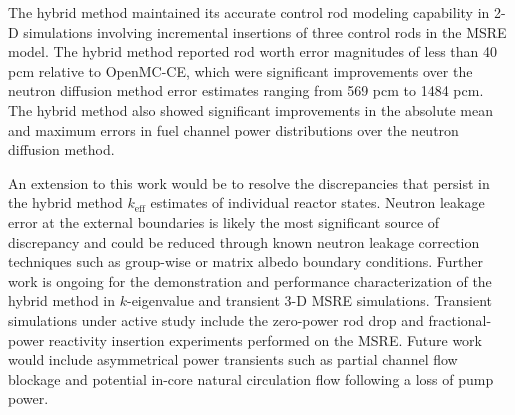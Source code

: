 The hybrid method maintained its accurate control rod modeling capability in 2-D simulations
involving incremental insertions of three control rods in the \gls{MSRE} model.
The hybrid method reported rod worth error magnitudes of less than 40 pcm relative to OpenMC-CE,
which were significant improvements over the neutron diffusion method error estimates ranging from
569 pcm to 1484 pcm. The hybrid method also showed significant improvements in the absolute mean
and maximum errors in fuel channel power distributions over the neutron diffusion method.

An extension to this work would be to resolve the discrepancies that persist in the hybrid method
$k_\text{eff}$ estimates of individual reactor states. Neutron leakage error at the external
boundaries is likely the most significant source of discrepancy and could be reduced through known
neutron leakage correction techniques such as group-wise or matrix albedo boundary conditions.
Further work is ongoing for the demonstration and performance characterization of the hybrid method
in $k$-eigenvalue and transient 3-D \gls{MSRE} simulations. Transient simulations under active
study include the zero-power rod drop and fractional-power reactivity insertion experiments
performed on the \gls{MSRE}. Future work would include asymmetrical power transients such as
partial channel flow blockage and potential in-core natural circulation flow following a loss of
pump power.

